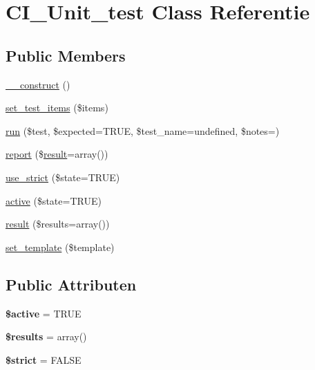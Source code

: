 \hypertarget{class_c_i___unit__test}{}\section{C\+I\+\_\+\+Unit\+\_\+test Class Referentie}
\label{class_c_i___unit__test}
\subsection*{Public Members}
\begin{DoxyCompactItemize}
\item 
\mbox{\hyperlink{class_c_i___unit__test_a095c5d389db211932136b53f25f39685}{\+\_\+\+\_\+construct}} ()
\item 
\mbox{\hyperlink{class_c_i___unit__test_a78e364204a36821e23124ae97d447aa3}{set\+\_\+test\+\_\+items}} (\$items)
\item 
\mbox{\hyperlink{class_c_i___unit__test_a0bb74f4cb9553ace4034633e69383c55}{run}} (\$test, \$expected=T\+R\+UE, \$test\+\_\+name=\textquotesingle{}undefined\textquotesingle{}, \$notes=\textquotesingle{}\textquotesingle{})
\item 
\mbox{\hyperlink{class_c_i___unit__test_a339c46eabb709c1c492bc264c9634171}{report}} (\$\mbox{\hyperlink{class_c_i___unit__test_adcfdd404b2f2610e0690b4beb7786ce5}{result}}=array())
\item 
\mbox{\hyperlink{class_c_i___unit__test_a3b12a79f69fab4221a0b887bdac1ba83}{use\+\_\+strict}} (\$state=T\+R\+UE)
\item 
\mbox{\hyperlink{class_c_i___unit__test_ac7b3030630fc7dd31513c75cf27c1a8a}{active}} (\$state=T\+R\+UE)
\item 
\mbox{\hyperlink{class_c_i___unit__test_adcfdd404b2f2610e0690b4beb7786ce5}{result}} (\$results=array())
\item 
\mbox{\hyperlink{class_c_i___unit__test_ae65d1ab2a626d4ddfda31befc2b347f6}{set\+\_\+template}} (\$template)
\end{DoxyCompactItemize}
\subsection*{Public Attributen}
\begin{DoxyCompactItemize}
\item 
\mbox{\label{class_c_i___unit__test_aacd1fa47b7ea59451aff98beca4360ae}} 
{\bfseries \$active} = T\+R\+UE
\item 
\mbox{\label{class_c_i___unit__test_a233d12bd8b6d3453e9a7a3f0b8c31db2}} 
{\bfseries \$results} = array()
\item 
\mbox{\label{class_c_i___unit__test_a856bf794dded1ba70be4dfae635a1b06}} 
{\bfseries \$strict} = F\+A\+L\+SE
\end{DoxyCompactItemize}
